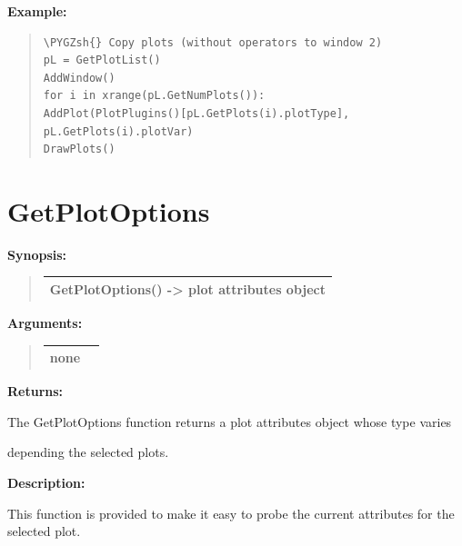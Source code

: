 \documentclass[letterpaper,10pt,english]{sphinxmanual}
\def\PYGZsh{\char`\#}
\begin{document}
\begin{DUlineblock}{0em}
\item[] \textbf{Example:}
\item[] 
\end{DUlineblock}
\begin{quote}

\begin{Verbatim}[commandchars=\\\{\}]
\PYGZsh{} Copy plots (without operators to window 2)
pL = GetPlotList()
AddWindow()
for i in xrange(pL.GetNumPlots()):
AddPlot(PlotPlugins()[pL.GetPlots(i).plotType], pL.GetPlots(i).plotVar)
DrawPlots()
\end{Verbatim}
\end{quote}


\section{GetPlotOptions}
\label{functions:getplotoptions}
\begin{DUlineblock}{0em}
\item[] \textbf{Synopsis:}
\end{DUlineblock}
\begin{quote}

\begin{tabulary}{\linewidth}{|L|}
\hline

GetPlotOptions() -\textgreater{} plot attributes object
\\
\hline\end{tabulary}

\end{quote}

\begin{DUlineblock}{0em}
\item[] 
\item[] \textbf{Arguments:}
\end{DUlineblock}
\begin{quote}

\begin{tabulary}{\linewidth}{|L|L|}
\hline

none
 & \\
\hline\end{tabulary}

\end{quote}

\begin{DUlineblock}{0em}
\item[] 
\item[] \textbf{Returns:}
\item[] The GetPlotOptions function returns a plot attributes object whose type varies
\item[] depending the selected plots.
\item[] 
\item[] \textbf{Description:}
\item[] This function is provided to make it easy to probe the current attributes for
the selected plot.
\end{DUlineblock}
\end{document}

